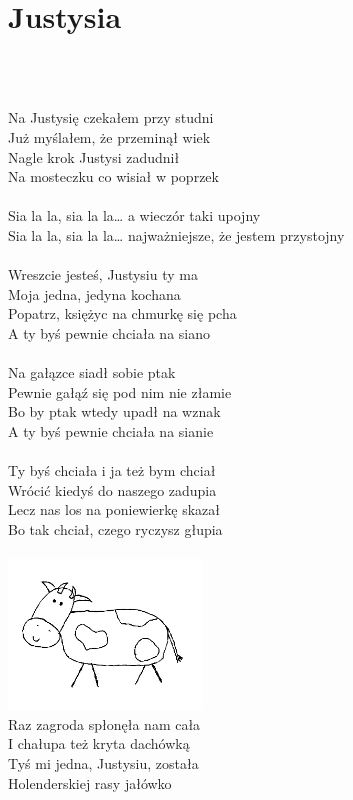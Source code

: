 \documentclass[a5paper, 10pt]{book}
\begin{document}
\newpage
\section{Justysia}\textcolor{lightgray}{\textit{}}\\~\\
\begin{minipage}[t]{0.75\textwidth}
  Na Justysię czekałem przy studni\\
  Już myślałem, że przeminął wiek\\
  Nagle krok Justysi zadudnił\\
  Na mosteczku co wisiał w poprzek\\
  \\
  \hspace*{5mm}Sia la la, sia la la… a wieczór taki upojny\\
  \hspace*{5mm}Sia la la, sia la la… najważniejsze, że jestem przystojny\\
  \\
  Wreszcie jesteś, Justysiu ty ma\\
  Moja jedna, jedyna kochana\\
  Popatrz, księżyc na chmurkę się pcha\\
  A ty byś pewnie chciała na siano\\
  \\
  Na gałązce siadł sobie ptak\\
  Pewnie gałąź się pod nim nie złamie\\
  Bo by ptak wtedy upadł na wznak\\
  A ty byś pewnie chciała na sianie\\
  \\
  Ty byś chciała i ja też bym chciał\\
  Wrócić kiedyś do naszego zadupia\\
  Lecz nas los na poniewierkę skazał\\
  Bo tak chciał, czego ryczysz głupia\\
  \\
  \includegraphics[height=4cm, angle=10, right]{images/justysia.png}\vspace*{-4.9cm}\\
  Raz zagroda spłonęła nam cała\\
  I chałupa też kryta dachówką\\
  Tyś mi jedna, Justysiu, została\\
  Holenderskiej rasy jałówko\\
  \\
\end{minipage}
\end{document}
